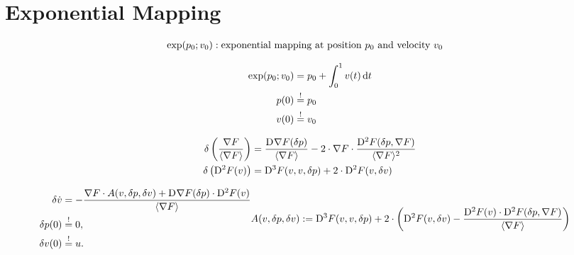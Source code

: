 \section{Exponential Mapping}


\begin{subequations}
\begin{align}
\exp( p_0; v_0 )  &:  \text{exponential mapping at position $ p_0 $ and velocity $ v_0 $}
\end{align}
\end{subequations}


\begin{subequations}
\begin{align}
\exp( p_0; v_0 )  &=  p_0  +  \int^1_0 v( t ) \,\mathrm{ d }{  t  }\\
p( 0 )  &\overset{ ! }{ = }   p_0\\
v( 0 )  &\overset{ ! }{ = }   v_0
\end{align}
\end{subequations}




\begin{subequations}
\begin{align}
\delta \left( \frac{ \nabla F  }{ \langle  \nabla F   \rangle } \right)  &=
\frac{ \mathrm{D}^{  } \nabla F  ( \delta p ) }{ \langle  \nabla F   \rangle }  -
2 \cdot \nabla F  \cdot \frac{ \mathrm{D}^{  2  } F ( \delta p, \nabla F  ) }{ \langle  \nabla F   \rangle^2 }
\label{vvdgl}\\
\delta\left( \mathrm{D}^{  2  } F ( v ) \right)  &=
\mathrm{D}^{  3  } F ( v, v, \delta p )  +
2 \cdot \mathrm{D}^{  2  } F ( v, \delta v )
\end{align}
\end{subequations}


\begin{subequations}
\begin{align}
\delta \dot{ v }   &=
- \frac{ \grad F \mult A( v, \delta p, \delta v  )
+  \diff{}{ \grad{ F } }( \delta p ) \mult \diff{ 2 }{ F }( v ) }{ \skaq{ \grad{ F } } } \\
\delta p( 0 )  &\overset{ ! }{ = }  0,\\
\delta v( 0 )  &\overset{ ! }{ = }  u.
\end{align}

\begin{align}
A( v, \delta p, \delta v  )  &:=
\diff{ 3 }{ F }( v, v, \delta p )  +
         2 \mult \left( \diff{ 2 }{ F }( v, \delta v ) -
                        \frac{ \diff{ 2 }{ F }( v ) \mult \diff{ 2 }{ F }( \delta p, \grad{ F } )
                                       }{ \skaq{ \grad{ F } } } \right)
\end{align}
\end{subequations}



